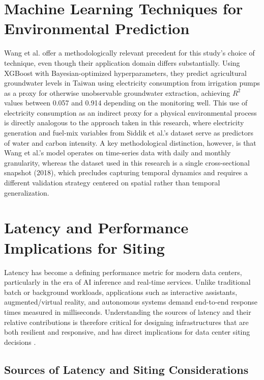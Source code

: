 \documentclass[conference]{IEEEtran}
\begin{document}
\section{Machine Learning Techniques for Environmental Prediction}

Wang et al. \cite{Wang2025XGBoost} offer a methodologically relevant precedent for this study's choice of technique, even though their application domain differs substantially. Using XGBoost with Bayesian-optimized hyperparameters, they predict agricultural groundwater levels in Taiwan using electricity consumption from irrigation pumps as a proxy for otherwise unobservable groundwater extraction, achieving $R^2$ values between 0.057 and 0.914 depending on the monitoring well. This use of electricity consumption as an indirect proxy for a physical environmental process is directly analogous to the approach taken in this research, where electricity generation and fuel-mix variables from Siddik et al.'s \cite{Siddik2021} dataset serve as predictors of water and carbon intensity. A key methodological distinction, however, is that Wang et al.'s model operates on time-series data with daily and monthly granularity, whereas the dataset used in this research is a single cross-sectional snapshot (2018), which precludes capturing temporal dynamics and requires a different validation strategy centered on spatial rather than temporal generalization.

\section{Latency and Performance Implications for Siting}

Latency has become a defining performance metric for modern data centers, particularly in the era of AI inference and real-time services. Unlike traditional batch or background workloads, applications such as interactive assistants, augmented/virtual reality, and autonomous systems demand end-to-end response times measured in milliseconds. Understanding the sources of latency and their relative contributions is therefore critical for designing infrastructures that are both resilient and responsive, and has direct implications for data center siting decisions \cite{Cruzes2026}.

\subsection{Sources of Latency and Siting Considerations}
\end{document}
